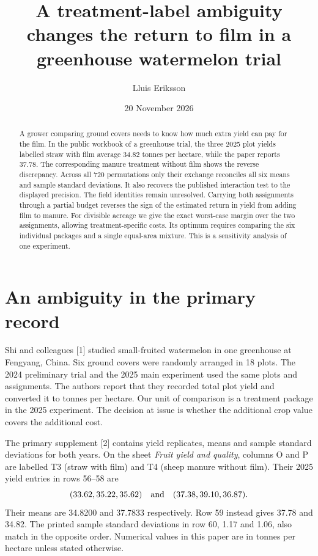 \documentclass[11pt]{article}
\title{A treatment-label ambiguity changes the return to film in a greenhouse watermelon trial}
\author{Lluis Eriksson}\date{20 November 2026}
\begin{document}
\maketitle
\begin{abstract}
A grower comparing ground covers needs to know how much extra yield can pay for the film. In the public workbook of a greenhouse trial, the three 2025 plot yields labelled straw with film average 34.82 tonnes per hectare, while the paper reports 37.78. The corresponding manure treatment without film shows the reverse discrepancy. Across all 720 permutations only their exchange reconciles all six means and sample standard deviations. It also recovers the published interaction test to the displayed precision. The field identities remain unresolved. Carrying both assignments through a partial budget reverses the sign of the estimated return in yield from adding film to manure. For divisible acreage we give the exact worst-case margin over the two assignments, allowing treatment-specific costs. Its optimum requires comparing the six individual packages and a single equal-area mixture. This is a sensitivity analysis of one experiment.
\end{abstract}

\section{An ambiguity in the primary record}
Shi and colleagues [1] studied small-fruited watermelon in one greenhouse at Fengyang, China. Six ground covers were randomly arranged in 18 plots. The 2024 preliminary trial and the 2025 main experiment used the same plots and assignments. The authors report that they recorded total plot yield and converted it to tonnes per hectare. Our unit of comparison is a treatment package in the 2025 experiment. The decision at issue is whether the additional crop value covers the additional cost.

The primary supplement [2] contains yield replicates, means and sample standard deviations for both years. On the sheet \emph{Fruit yield and quality}, columns O and P are labelled T3 (straw with film) and T4 (sheep manure without film). Their 2025 yield entries in rows 56--58 are
\[
  (33.62,35.22,35.62)\quad\hbox{and}\quad(37.38,39.10,36.87).
\]
Their means are 34.8200 and 37.7833 respectively. Row 59 instead gives 37.78 and 34.82. The printed sample standard deviations in row 60, 1.17 and 1.06, also match in the opposite order. Numerical values in this paper are in tonnes per hectare unless stated otherwise.
\end{document}
